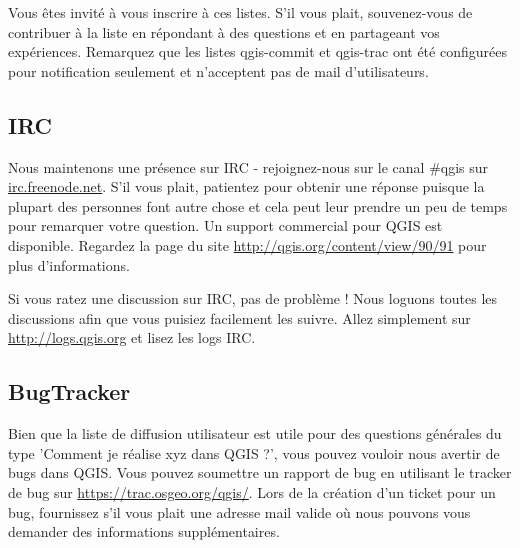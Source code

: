 Vous êtes invité à vous inscrire à ces listes. S'il vous plait, souvenez-vous de
contribuer à la liste en répondant à des questions et en partageant vos
expériences. Remarquez que les listes qgis-commit et qgis-trac ont été
configurées pour notification seulement et n'acceptent pas de mail
d'utilisateurs.

\subsection{IRC}
Nous maintenons une présence sur IRC - rejoignez-nous sur le canal \#qgis sur
\url{irc.freenode.net}. S'il vous plait, patientez pour obtenir une réponse
puisque la plupart des personnes font autre chose et cela peut leur prendre un
peu de temps pour remarquer votre question. Un support commercial pour QGIS est
disponible. Regardez la page du site \url{http://qgis.org/content/view/90/91}
pour plus d'informations.

Si vous ratez une discussion sur IRC, pas de problème ! Nous loguons toutes les
discussions afin que vous puisiez facilement les suivre. Allez simplement sur
\url{http://logs.qgis.org} et lisez les logs IRC.

\subsection{BugTracker}
Bien que la liste de diffusion utilisateur est utile pour des questions
générales du type 'Comment je réalise xyz dans QGIS ?', vous pouvez vouloir
nous avertir de bugs dans QGIS. Vous pouvez soumettre un rapport de bug en
utilisant le tracker de bug sur \url{https://trac.osgeo.org/qgis/}. Lors de la
création d'un ticket pour un bug, fournissez s'il vous plait une adresse mail
valide où nous pouvons vous demander des informations supplémentaires.

